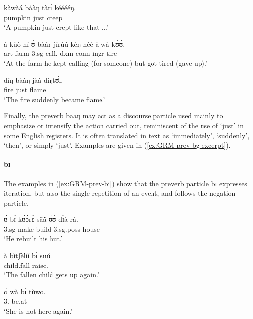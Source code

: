 \begin{exe}
\begin{exe}
\begin{exe}
{\begin{exe}
\begin{exe}
\begin{exe}
\begin{exe}
\begin{exe}
\begin{exe}
\begin{exe}
\begin{exe}
\begin{exe}
\begin{exe}
\begin{exe}
\begin{exe}
\begin{exe}
\begin{exe}
\begin{exe}
\begin{exe}
\begin{exe}
\begin{exe}
\begin{exe}
\begin{exe}
\ex
\gll kàwàá bààŋ tàrɪ̀ kééééŋ.\\
pumpkin just creep {\advm}\\
\glt `A pumpkin just crept like that ...' 

\ex
\gll à kùò ní ʊ̀ bààŋ jírúú kéŋ néé à wà kʊ̀ʊ̀.\\
{\sc art} farm {\postp}  {\sc 3.sg} {\mod} call.{\ipfv} {\sc dxm} {\foc} {\sc 
conn} {\sc ingr} tire\\
\glt `At the farm he kept calling (for someone) but got tired (gave up).'


\ex
\gll díŋ bààŋ jàà dìŋtʊ́l̀.\\
fire  just {\ident} flame\\
\glt `The fire suddenly became flame.'

 \z 
 \z

 Finally, the preverb  {\sls baaŋ} may act as a discourse particle used mainly 
to 
emphasize or intensify the action carried out, reminiscent of  the use of 
`just' 
in some English registers.  It is often translated in text as `immediately', 
`suddenly', `then',  or simply `just'. Examples are given in 
(\ref{ex:GRM-prev-bg-excerpt}).


\paragraph{bɪ}
\label{sec:GRM-preverb-iteration}

The examples in (\ref{ex:GRM-prev-bi}) show that  the preverb particle {\sls bɪ}
expresses iteration, but also the single repetition of an event, and follows the
negation particle. 



\ea\label{ex:GRM-prev-bi}

\ea\label{ex:vp33.2.}
\gll ʊ̀ bɪ́ kʊ̀ɔ̀rɛ̀ sã̀ã̀ ʊ̀ʊ̀ dɪ̀à rá.\\
 {\sc 3.sg}  {\itr} make build {\sc 3.sg.poss} house {\foc}\\
\glt  `He rebuilt his hut.' 


\ex\label{ex:GRM-vp10.4}
\gll à bìtʃèlíí bɪ́ sīīú.\\
 {\art}  child.fall   {\itr} raise.{\foc}\\
\glt  `The fallen child gets up again.' 



\ex\label{ex:vp10.4.}
\gll ʊ̀ wà bɪ́ tùwō.\\
    {3.\sg} {\neg} {\itr} be.at\\
\glt  `She is not here again.' 


\end{exe}
\end{exe}
\end{exe}
\end{exe}
\end{exe}
\end{exe}
\end{exe}
\end{exe}
\end{exe}
\end{exe}
\end{exe}
\end{exe}
\end{exe}
\end{exe}
\end{exe}
\end{exe}
\end{exe}
\end{exe}
\end{exe}
\end{exe}}
\end{exe}
\end{exe}
\end{exe}

